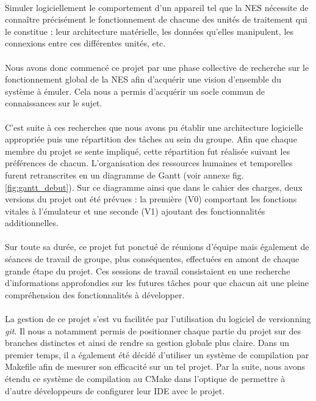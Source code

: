 \paragraph{}

Simuler logiciellement le comportement d'un appareil tel que la NES nécessite de connaître précisément le fonctionnement de chacune des unités de traitement qui le constitue : leur architecture matérielle, les données qu'elles manipulent, les connexions entre ces différentes unités, etc.

\paragraph{}
Nous avons donc commencé ce projet par une phase collective de recherche sur le fonctionnement global de la NES afin d'acquérir une vision d'ensemble du système à émuler. Cela nous a permis d'acquérir un socle commun de connaissances sur le sujet.

\paragraph{}
C'est suite à ces recherches que nous avons pu établir une architecture logicielle appropriée puis une répartition des tâches au sein du groupe. Afin que chaque membre du projet se sente impliqué, cette répartition fut réalisée suivant les préférences de chacun. L'organisation des ressources humaines et temporelles furent retranscrites en un diagramme de Gantt (voir annexe fig. \ref{fig:gantt_debut}). Sur ce diagramme ainsi que dans le cahier des charges, deux versions du projet ont été prévues : la première (V0) comportant les fonctions vitales à l'émulateur et une seconde (V1) ajoutant des fonctionnalités additionnelles.

\paragraph{}
Sur toute sa durée, ce projet fut ponctué de réunions d'équipe mais également de séances de travail de groupe, plus conséquentes, effectuées en amont de chaque grande étape du projet. Ces sessions de travail consistaient en une recherche d'informations approfondies sur les futures tâches pour que chacun ait une pleine compréhension des fonctionnalités à développer.

\paragraph{}
La gestion de ce projet s'est vu facilitée par l'utilisation du logiciel de versionning \emph{git}. Il nous a notamment permis de positionner chaque partie du projet sur des branches distinctes et ainsi de rendre sa gestion globale plus claire. Dans un premier temps, il a également été décidé d'utiliser un système de compilation par Makefile afin de mesurer son efficacité sur un tel projet. Par la suite, nous avons étendu ce système de compilation au CMake dans l'optique de permettre à d'autre développeurs de configurer leur IDE avec le projet.
